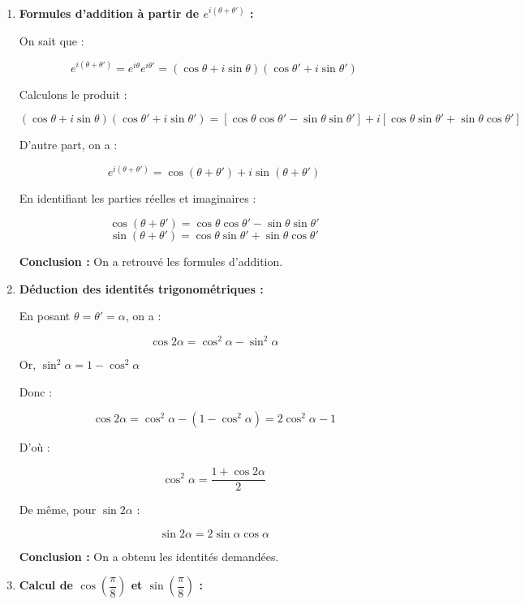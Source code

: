 \documentclass[a4paper,12pt]{article}
\begin{document}
\begin{solutionbox}
\begin{enumerate}
    \item \textbf{Formules d'addition à partir de \( e^{i(\theta + \theta')} \) :}

    On sait que :

    \[
    e^{i(\theta + \theta')} = e^{i\theta} e^{i\theta'} = (\cos \theta + i \sin \theta)(\cos \theta' + i \sin \theta')
    \]

    Calculons le produit :

    \[
    (\cos \theta + i \sin \theta)(\cos \theta' + i \sin \theta') = [ \cos \theta \cos \theta' - \sin \theta \sin \theta' ] + i [ \cos \theta \sin \theta' + \sin \theta \cos \theta' ]
    \]

    D'autre part, on a :

    \[
    e^{i(\theta + \theta')} = \cos(\theta + \theta') + i \sin(\theta + \theta')
    \]

    En identifiant les parties réelles et imaginaires :

    \[
    \cos(\theta + \theta') = \cos \theta \cos \theta' - \sin \theta \sin \theta'
    \]
    \[
    \sin(\theta + \theta') = \cos \theta \sin \theta' + \sin \theta \cos \theta'
    \]

    \textbf{Conclusion :} On a retrouvé les formules d'addition.

    \item \textbf{Déduction des identités trigonométriques :}

    En posant \( \theta = \theta' = \alpha \), on a :

    \[
    \cos 2\alpha = \cos^2 \alpha - \sin^2 \alpha
    \]

    Or, \( \sin^2 \alpha = 1 - \cos^2 \alpha \)

    Donc :

    \[
    \cos 2\alpha = \cos^2 \alpha - (1 - \cos^2 \alpha) = 2 \cos^2 \alpha - 1
    \]

    D'où :

    \[
    \cos^2 \alpha = \dfrac{1 + \cos 2\alpha}{2}
    \]

    De même, pour \( \sin 2\alpha \) :

    \[
    \sin 2\alpha = 2 \sin \alpha \cos \alpha
    \]

    \textbf{Conclusion :} On a obtenu les identités demandées.

    \item \textbf{Calcul de \( \cos\left( \dfrac{\pi}{8} \right) \) et \( \sin\left( \dfrac{\pi}{8} \right) \) :}


\end{enumerate}
\end{solutionbox}
\end{document}
